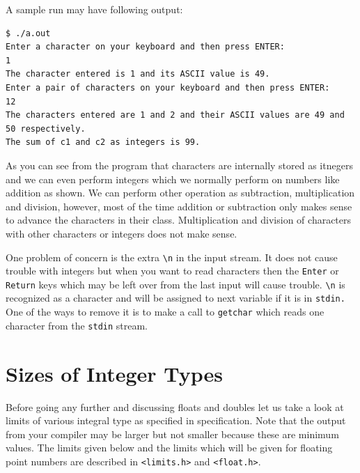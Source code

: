 A sample run may have following output:

\begin{verbatim}
$ ./a.out
Enter a character on your keyboard and then press ENTER:
1
The character entered is 1 and its ASCII value is 49.
Enter a pair of characters on your keyboard and then press ENTER:
12
The characters entered are 1 and 2 and their ASCII values are 49 and 50 respectively.
The sum of c1 and c2 as integers is 99.
\end{verbatim}

As you can see from the program that characters are internally stored as
itnegers and we can even perform integers which we normally perform on
numbers like addition as shown. We can perform other operation as subtraction,
multiplication and division, however, most of the time addition or subtraction
only makes sense to advance the characters in their class. Multiplication and
division of characters with other characters or integers does not make sense.

One problem of concern is the extra \texttt{\textbackslash n} in the input
stream. It does not cause trouble with integers but when you want to read
characters then the \texttt{Enter} or \texttt{Return} keys which may be left
over from the last input will cause trouble. \texttt{\textbackslash n} is
recognized as a character and will be assigned to next variable if it is in
\texttt{stdin.} One of the ways to remove it is to make a call to
\texttt{getchar} which reads one character from the \texttt{stdin} stream.

\section{Sizes of Integer Types}
Before going any further and discussing floats and doubles let us take a look
at limits of various integral type as specified in specification. Note that the
output from your compiler may be larger but not smaller because these are
minimum values. The limits given below and the limits which will be given for
floating point numbers are described in \texttt{<limits.h>} and
\texttt{<float.h>}.

